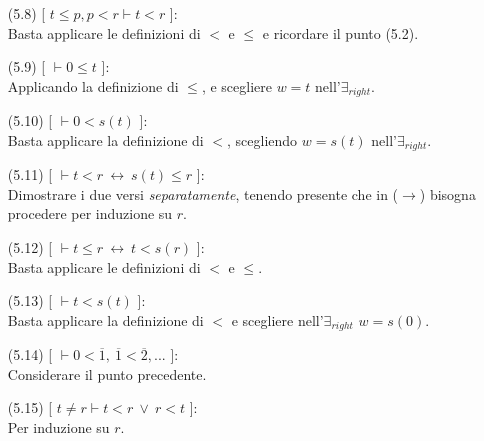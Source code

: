 \begin{enumerate}
\begin{itemize}
\vspace{.5cm}
\end{itemize}
\newpage
	\item[(5.8)] [ $t\leq p,p<r\vdash t<r$ ]:
	\vspace{.2cm}
	\\Basta applicare le definizioni di $<$ e $\leq$ e ricordare il punto (5.2).
	\vspace{.5cm}
	\item[(5.9)] [ $\vdash 0\leq t$ ]:
	\vspace{.2cm}
	\\Applicando la definizione di $\leq$, e scegliere $w=t$ nell'$\exists_{right}$.
	\vspace{.5cm}
	\item[(5.10)] [ $\vdash 0<s(t)$ ]:
	\vspace{.2cm}
	\\Basta applicare la definizione di $<$, scegliendo $w=s(t)$ nell'$\exists_{right}$.
	\vspace{.5cm}
	\item[(5.11)] [ $\vdash t<r\ \leftrightarrow\ s(t)\leq r$ ]:
	\vspace{.2cm}
	\\Dimostrare i due versi \textsl{separatamente}, tenendo presente che in ($\rightarrow$) bisogna procedere per induzione su $r$.
	\vspace{.5cm}
	\item[(5.12)] [ $\vdash t\leq r\ \leftrightarrow\ t<s(r)$ ]:
	\vspace{.2cm}
	\\Basta applicare le definizioni di $<$ e $\leq$.
	\vspace{.5cm}
	\item[(5.13)] [ $\vdash t<s(t)$ ]:
	\vspace{.2cm}
	\\Basta applicare la definizione di $<$ e scegliere nell'$\exists_{right}$ $w=s(0)$.
	\vspace{.5cm}
	\item[(5.14)] [ $\vdash 0<\overline{1},\ \overline{1}<\overline{2},...$ ]:
	\vspace{.2cm}
	\\Considerare il punto precedente.
	\vspace{.5cm}
	\item[(5.15)] [ $t\neq r\vdash t<r\ \vee\ r<t$ ]:
	\vspace{.2cm}
	\\Per induzione su $r$.
	\vspace{.2cm}

\end{enumerate}
